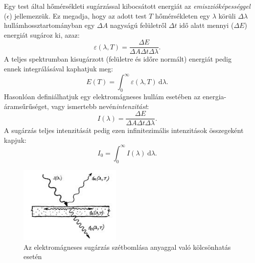 \documentclass[a4paper, 12pt]{article}
\begin{document}
    Egy test által hőmérsékleti sugárzással kibocsátott energiát az \textit{emiszzióképességgel} ($\epsilon$) jellemezzük.
    Ez megadja, hogy az adott test $T$ hőmérsékleten egy $\lambda$ körüli $\Delta\lambda$ hullámhossztartományban egy $\Delta A$ nagyságú felületről $\Delta t$ idő alatt mennyi ($\Delta E$) energiát sugároz ki, azaz:
    \begin{equation}
        \varepsilon(\lambda, T)=\frac{\Delta E}{\Delta A\Delta t\Delta\lambda}.\label{eq:0eps}
    \end{equation}
    A teljes spektrumban kisugárzott (felületre és időre normált) energiát pedig ennek integrálásával kaphatjuk meg:
    \begin{equation}
        E(T)=\int_{0}^{\infty} \varepsilon(\lambda, T)~\mathrm{d}\lambda.\label{eq:0E}
    \end{equation}
    Hasonlóan definiálhatjuk egy elektromágneses hullám esetében az energia-áramsűrűséget, vagy ismertebb nevén\textit{intenzitást}:
    \begin{equation}
        I(\lambda)=\frac{\Delta E}{\Delta A\Delta t\Delta\lambda}.\label{eq:0I}
    \end{equation}
    A sugárzás teljes intenzitását pedig ezen infinitezimális intenzitások összegeként kapjuk:
    \begin{equation}
        I_0=\int_{0}^{\infty} I(\lambda)~\mathrm{d}\lambda.\label{eq:0I0}
    \end{equation}
    \begin{figure}[H]
        \centering
        \includegraphics[width=5cm]{200px-Fenytores_homsug}
        \caption{Az elektromágneses sugárzás szétbomlása anyaggal való kölcsönhatás esetén \cite{leir}}
        \label{fig:0em}
    \end{figure}
\end{document}
